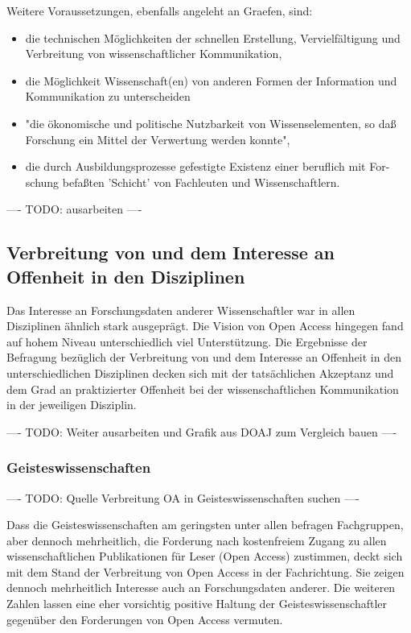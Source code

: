 Weitere Voraussetzungen, ebenfalls angeleht an Graefen, sind:
\begin{itemize}
\item die technischen Möglichkeiten der schnellen Erstellung, Vervielfältigung und Verbreitung von wissenschaftlicher Kommunikation,
\item die Möglichkeit Wissenschaft(en) von anderen Formen der Information und Kommunikation zu unterscheiden
\item "die ökonomische und politische Nutzbarkeit von Wissenselementen, so daß
Forschung ein Mittel der Verwertung werden konnte",
\item die durch Ausbildungsprozesse gefestigte Existenz einer beruflich mit For-
schung befaßten 'Schicht' von Fachleuten und Wissenschaftlern.
\end{itemize}

---- TODO: ausarbeiten ----

\subsection{Verbreitung von und dem Interesse an Offenheit in den Disziplinen}

Das Interesse an Forschungsdaten anderer Wissenschaftler war in allen Disziplinen ähnlich stark ausgeprägt. Die Vision von Open Access hingegen fand auf hohem Niveau unterschiedlich viel Unterstützung. Die Ergebnisse der Befragung bezüglich der Verbreitung von und dem Interesse an Offenheit in den unterschiedlichen Disziplinen decken sich mit der tatsächlichen Akzeptanz und dem Grad an praktizierter Offenheit bei der wissenschaftlichen Kommunikation in der jeweiligen Disziplin.

---- TODO: Weiter ausarbeiten und Grafik aus DOAJ zum Vergleich bauen  ----

\subsubsection{Geisteswissenschaften}

---- TODO: Quelle Verbreitung OA in Geisteswissenschaften suchen  ----

Dass die Geisteswissenschaften am geringsten unter allen befragen Fachgruppen, aber dennoch mehrheitlich, die Forderung nach kostenfreiem Zugang zu allen wissenschaftlichen Publikationen für Leser (Open Access) zustimmen, deckt sich mit dem Stand der Verbreitung von Open Access in der Fachrichtung. Sie zeigen dennoch mehrheitlich Interesse auch an Forschungsdaten anderer. Die weiteren Zahlen lassen eine eher vorsichtig positive Haltung der Geisteswissenschaftler gegenüber den Forderungen von Open Access vermuten.

